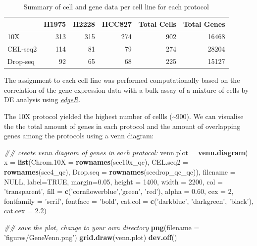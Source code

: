 \documentclass[]{book}
\newenvironment{Shaded}{\begin{snugshade}}{\end{snugshade}}
\newcommand{\CommentTok}[1]{\textcolor[rgb]{0.56,0.35,0.01}{\textit{#1}}}
\newcommand{\DataTypeTok}[1]{\textcolor[rgb]{0.13,0.29,0.53}{#1}}
\newcommand{\DecValTok}[1]{\textcolor[rgb]{0.00,0.00,0.81}{#1}}
\newcommand{\FloatTok}[1]{\textcolor[rgb]{0.00,0.00,0.81}{#1}}
\newcommand{\KeywordTok}[1]{\textcolor[rgb]{0.13,0.29,0.53}{\textbf{#1}}}
\newcommand{\NormalTok}[1]{#1}
\newcommand{\OtherTok}[1]{\textcolor[rgb]{0.56,0.35,0.01}{#1}}
\newcommand{\StringTok}[1]{\textcolor[rgb]{0.31,0.60,0.02}{#1}}
\theoremstyle{definition}
\theoremstyle{definition}
\theoremstyle{definition}
\theoremstyle{remark}
\begin{document}
\begin{table}

\caption{\label{tab:1-summaryKable}Summary of cell and gene data 
      per cell line for each protocol}
\centering
\begin{tabular}[t]{l|r|r|r|r|r}
\hline
  & H1975 & H2228 & HCC827 & Total Cells & Total Genes\\
\hline
10X & 313 & 315 & 274 & 902 & 16468\\
\hline
CEL-seq2 & 114 & 81 & 79 & 274 & 28204\\
\hline
Drop-seq & 92 & 65 & 68 & 225 & 15127\\
\hline
\end{tabular}
\end{table}

The assignment to each cell line was performed computationally based on
the correlation of the gene expression data with a bulk assay of a
mixture of cells by DE analysis using
\href{https://bioconductor.org/packages/release/bioc/html/edgeR.html}{\emph{edgeR}}.

The 10X protocol yielded the highest number of cellls
(\textasciitilde{}900). We can visualise the the total amount of genes
in each protocol and the amount of overlapping genes among the protocols
using a venn diagram:

\begin{Shaded}
\begin{Highlighting}[]
\CommentTok{## create venn diagram of genes in each protocol:}
\NormalTok{venn.plot =}\StringTok{ }\KeywordTok{venn.diagram}\NormalTok{(}
  \DataTypeTok{x =} \KeywordTok{list}\NormalTok{(}\DataTypeTok{Chrom.10X =} \KeywordTok{rownames}\NormalTok{(sce10x_qc),}
           \DataTypeTok{CEL.seq2 =} \KeywordTok{rownames}\NormalTok{(sce4_qc),}
           \DataTypeTok{Drop.seq =} \KeywordTok{rownames}\NormalTok{(scedrop_qc_qc)),}
  \DataTypeTok{filename =} \OtherTok{NULL}\NormalTok{, }\DataTypeTok{label=}\OtherTok{TRUE}\NormalTok{, }\DataTypeTok{margin=}\FloatTok{0.05}\NormalTok{,}
  \DataTypeTok{height =} \DecValTok{1400}\NormalTok{, }\DataTypeTok{width =} \DecValTok{2200}\NormalTok{,}
  \DataTypeTok{col =} \StringTok{'transparent'}\NormalTok{, }\DataTypeTok{fill =} \KeywordTok{c}\NormalTok{(}\StringTok{'cornflowerblue'}\NormalTok{,}\StringTok{'green'}\NormalTok{, }\StringTok{'red'}\NormalTok{),}
  \DataTypeTok{alpha =} \FloatTok{0.60}\NormalTok{, }\DataTypeTok{cex =} \DecValTok{2}\NormalTok{, }\DataTypeTok{fontfamily =} \StringTok{'serif'}\NormalTok{, }\DataTypeTok{fontface =} \StringTok{'bold'}\NormalTok{,}
  \DataTypeTok{cat.col =} \KeywordTok{c}\NormalTok{(}\StringTok{'darkblue'}\NormalTok{, }\StringTok{'darkgreen'}\NormalTok{, }\StringTok{'black'}\NormalTok{), }\DataTypeTok{cat.cex =} \FloatTok{2.2}\NormalTok{)}

\CommentTok{## save the plot, change to your own directory}
\KeywordTok{png}\NormalTok{(}\DataTypeTok{filename =} \StringTok{'figures/GeneVenn.png'}\NormalTok{)}
\KeywordTok{grid.draw}\NormalTok{(venn.plot)}
\KeywordTok{dev.off}\NormalTok{()}
\end{Highlighting}
\end{Shaded}
\end{document}
